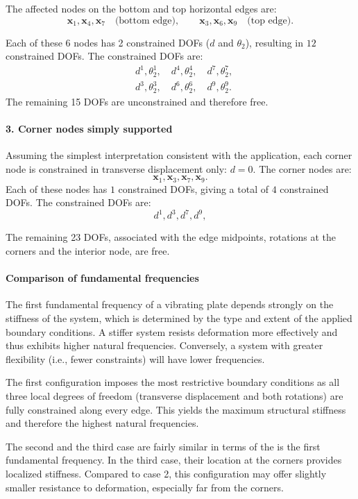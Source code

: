 \documentclass[12pt]{article}
\begin{document}
The affected nodes on the bottom and top horizontal edges are:
\[
    \mathbf{x}_1, \mathbf{x}_4, \mathbf{x}_7 \quad \text{(bottom edge)}, \qquad \mathbf{x}_3, \mathbf{x}_6, \mathbf{x}_9 \quad \text{(top edge)}.
\]

Each of these 6 nodes has 2 constrained DOFs (\(d\) and \(\theta_2\)), resulting in \(12\) constrained DOFs. The constrained DOFs are:
\[
    \begin{aligned}
         & d^1, \theta_2^1, \quad d^4, \theta_2^4, \quad d^7, \theta_2^7, \\
         & d^3, \theta_2^3, \quad d^6, \theta_2^6, \quad d^9, \theta_2^9.
    \end{aligned}
\]
The remaining 15 DOFs are unconstrained and therefore free.

\paragraph*{3. Corner nodes simply supported} Assuming the simplest interpretation consistent with the application, each corner node is constrained in transverse displacement only: $d = 0$. The corner nodes are:
\[
    \mathbf{x}_1, \mathbf{x}_3, \mathbf{x}_7, \mathbf{x}_9.
\]
Each of these nodes has $1$ constrained DOFs, giving a total of \(4\) constrained DOFs. The constrained DOFs are:
\[ d^1, d^3, d^7, d^9,
\]

The remaining 23 DOFs, associated with the edge midpoints, rotations at the corners and the interior node, are free.

\paragraph*{Comparison of fundamental frequencies}
The first fundamental frequency of a vibrating plate depends strongly on the stiffness of the system, which is determined by the type and extent of the applied boundary conditions. A stiffer system resists deformation more effectively and thus exhibits higher natural frequencies. Conversely, a system with greater flexibility (i.e., fewer constraints) will have lower frequencies.


The first configuration imposes the most restrictive boundary conditions as all three local degrees of freedom (transverse displacement and both rotations) are fully constrained along every edge. This yields the maximum structural stiffness and therefore the highest natural frequencies.

The second and the third case are fairly similar in terms of the is the first fundamental frequency. In the third case, their location at the corners provides localized stiffness. Compared to case 2, this configuration may offer slightly smaller resistance to deformation, especially far from the corners.
\end{document}
